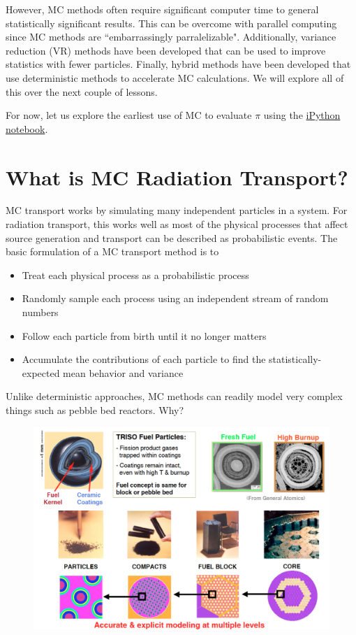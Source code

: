 \documentclass[12pt]{article}
\newlength{\up}
\begin{document}
However, MC methods often require significant computer time to general statistically significant results.
This can be overcome with parallel computing since MC methods are ``embarrassingly parralelizable".
Additionally, variance reduction (VR) methods have been developed that can be used to improve statistics with fewer particles. 
Finally, hybrid methods have been developed that use deterministic methods to accelerate MC calculations.
We will explore all of this over the next couple of lessons.

For now, let us explore the earliest use of MC to evaluate $\pi$ using the \href{08-02_Evaluating-Pi.ipynb}{iPython notebook}.

\section*{What is MC Radiation Transport?}

MC transport works by simulating many independent particles in a system.
For radiation transport, this works well as most of the physical processes that affect source generation and transport can be described as probabilistic events.  
The basic formulation of a MC transport method is to

\begin{itemize}
 \item Treat each physical process as a probabilistic process
 \item Randomly sample each process using an independent stream of random numbers
 \item Follow each particle from birth until it no longer matters
 \item Accumulate the contributions of each particle to find the statistically-expected mean behavior and variance
\end{itemize}

Unlike deterministic approaches, MC methods can readily model very complex things such as  pebble bed reactors.  Why?

\begin{figure}[h!]
\begin{center}
\includegraphics[scale=0.6]{../figs/triso.png}
\end{center}
\end{figure}
\end{document}
